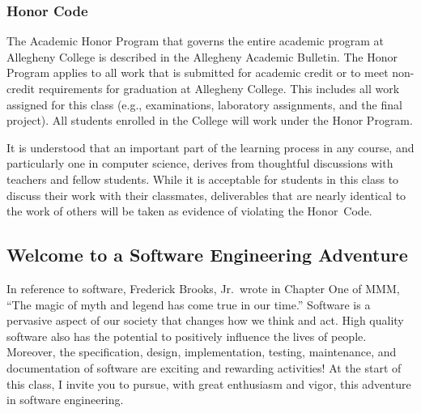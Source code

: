 \documentclass[11pt]{article}
\begin{document}
\subsubsection*{Honor Code}

The Academic Honor Program that governs the entire academic program at Allegheny College is described in the Allegheny
Academic Bulletin. The Honor Program applies to all work that is submitted for academic credit or to meet non-credit
requirements for graduation at Allegheny College. This includes all work assigned for this class (e.g., examinations,
laboratory assignments, and the final project). All students enrolled in the College will work under the Honor Program.



\noindent It is understood that an important part of the learning process in any course, and particularly one in
computer science, derives from thoughtful discussions with teachers and fellow students. While it is acceptable for
students in this class to discuss their work with their classmates, deliverables that are nearly identical to the work
of others will be taken as evidence of violating the \mbox{Honor Code}.

\subsection*{Welcome to a Software Engineering Adventure}

In reference to software, Frederick Brooks, Jr.\ wrote in Chapter One of MMM, ``The magic of myth and legend has come
true in our time.'' Software is a pervasive aspect of our society that changes how we think and act. High quality
software also has the potential to positively influence the lives of people. Moreover, the specification, design,
implementation, testing, maintenance, and documentation of software are exciting and rewarding activities! At the start
of this class, I invite you to pursue, with great enthusiasm and vigor, this adventure in software engineering.
\end{document}
